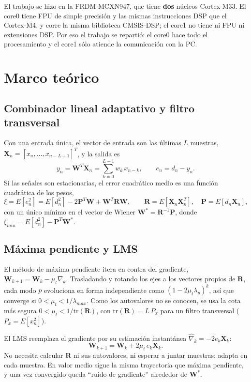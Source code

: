 \documentclass[11pt,a4paper]{article}
\begin{document}
El trabajo se hizo en la FRDM-MCXN947, que tiene \textbf{dos} núcleos Cortex-M33. El core0 tiene 
FPU de simple precisión y las mismas instrucciones DSP que el Cortex-M4, y corre la misma 
biblioteca CMSIS-DSP; el core1 no tiene ni FPU ni extensiones DSP. Por eso el trabajo se 
repartió: el core0 hace todo el procesamiento y el core1 sólo atiende la comunicación con la PC.

\section{Marco teórico}

\subsection{Combinador lineal adaptativo y filtro transversal}
Con una entrada única, el vector de entrada son las últimas $L$ muestras,
$\mathbf{X}_n = [x_n, \dots, x_{n-L+1}]^T$, y la salida es
\begin{equation}
  y_n = \mathbf{W}^T\mathbf{X}_n = \sum_{k=0}^{L-1} w_k\, x_{n-k},
  \qquad e_n = d_n - y_n .
\end{equation}
Si las señales son estacionarias, el error cuadrático medio es una función cuadrática de los
pesos,
\begin{equation}
  \xi = E[e_n^2] = E[d_n^2] - 2\mathbf{P}^T\mathbf{W} + \mathbf{W}^T\mathbf{R}\mathbf{W},
  \qquad \mathbf{R} = E[\mathbf{X}_n\mathbf{X}_n^T],\quad \mathbf{P} = E[d_n\mathbf{X}_n],
\end{equation}
con un único mínimo en el vector de Wiener $\mathbf{W}^* = \mathbf{R}^{-1}\mathbf{P}$, donde
$\xi_{min} = E[d_n^2] - \mathbf{P}^T\mathbf{W}^*$.

\subsection{Máxima pendiente y LMS}
El método de máxima pendiente itera en contra del gradiente,
$\mathbf{W}_{k+1} = \mathbf{W}_k - \mu_{t}\nabla_k$. Trasladando y rotando los ejes a los
vectores propios de $\mathbf{R}$, cada modo $p$ evoluciona en forma independiente como
$(1-2\mu_t\lambda_p)^k$, así que converge si $0 < \mu_t < 1/\lambda_{max}$. Como los autovalores
no se conocen, se usa la cota más segura $0<\mu_t<1/\mathrm{tr}(\mathbf{R})$, con
$\mathrm{tr}(\mathbf{R}) = L\,P_x$ para un filtro transversal ($P_x = E[x_n^2]$).

El LMS reemplaza el gradiente por su estimación instantánea $\hat\nabla_k = -2e_k\mathbf{X}_k$:
\begin{equation}
  \mathbf{W}_{k+1} = \mathbf{W}_k + 2\mu_t\, e_k\mathbf{X}_k .
\end{equation}
No necesita calcular $\mathbf{R}$ ni sus autovalores, ni esperar a juntar muestras: adapta en cada
muestra. En valor medio sigue la misma trayectoria que máxima pendiente, y una vez convergido
queda ``ruido de gradiente'' alrededor de $\mathbf{W}^*$.
\end{document}
